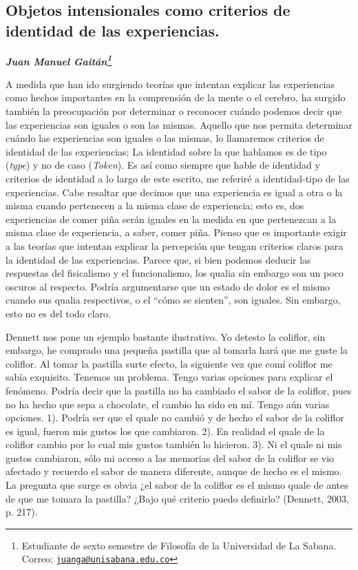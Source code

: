 \documentclass[]{book}
\newcommand{\autor}[1]{            %
  \begin{center}                   %
    \vspace*{-3.5em}               %
    \textbf{\textit{\large #1}}    %
    \vspace*{+4em}                 %
  \end{center}
}
\begin{document}
\begin{refsection}
\chapter{\texorpdfstring{\textbf{Objetos intensionales como criterios de
identidad de las
experiencias.}}{Objetos intensionales como criterios de identidad de las experiencias.}}\label{objetos-intensionales-como-criterios-de-identidad-de-las-experiencias.}

\autor{Juan Manuel Gaitán\footnote{Estudiante de sexto semestre de
  Filosofía de la Universidad de La Sabana. Correo:
  \href{mailto:juanga@unisabana.edu.co}{\nolinkurl{juanga@unisabana.edu.co}}}}

A medida que han ido surgiendo teorías que intentan explicar las
experiencias como hechos importantes en la comprensión de la mente o el
cerebro, ha surgido también la preocupación por determinar o reconocer
cuándo podemos decir que las experiencias son iguales o son las mismas.
Aquello que nos permita determinar cuándo las experiencias son iguales o
las mismas, lo llamaremos criterios de identidad de las experiencias; La
identidad sobre la que hablamos es de tipo (\emph{type}) y no de caso
(\emph{Token}). Es así como siempre que hable de identidad y criterios
de identidad a lo largo de este escrito, me referiré a identidad-tipo de
las experiencias. Cabe resaltar que decimos que una experiencia es igual
a otra o la misma cuando pertenecen a la misma clase de experiencia;
esto es, dos experiencias de comer piña serán iguales en la medida en
que pertenezcan a la misma clase de experiencia, a saber, comer piña.
Pienso que es importante exigir a las teorías que intentan explicar la
percepción que tengan criterios claros para la identidad de las
experiencias. Parece que, si bien podemos deducir las respuestas del
fisicalismo y el funcionalismo, los qualia sin embargo son un poco
oscuros al respecto. Podría argumentarse que un estado de dolor es el
mismo cuando sus qualia respectivos, o el ``cómo se sienten'', son
iguales. Sin embargo, esto no es del todo claro.

Dennett nos pone un ejemplo bastante ilustrativo. Yo detesto la
coliflor, sin embargo, he comprado una pequeña pastilla que al tomarla
hará que me guste la coliflor. Al tomar la pastilla surte efecto, la
siguiente vez que comí coliflor me sabía exquisito. Tenemos un problema.
Tengo varias opciones para explicar el fenómeno. Podría decir que la
pastilla no ha cambiado el sabor de la coliflor, pues no ha hecho que
sepa a chocolate, el cambio ha sido en mí. Tengo aún varias opciones.
1). Podría ser que el quale no cambió y de hecho el sabor de la coliflor
es igual, fueron mis gustos los que cambiaron. 2). En realidad el quale
de la coliflor cambio por lo cual mis gustos también lo hicieron. 3). Ni
el quale ni mis gustos cambiaron, sólo mi acceso a las memorias del
sabor de la coliflor se vio afectado y recuerdo el sabor de manera
diferente, aunque de hecho es el mismo. La pregunta que surge es obvia
¿el sabor de la coliflor es el mismo quale de antes de que me tomara la
pastilla? ¿Bajo qué criterio puedo definirlo? (Dennett, 2003, p. 217).


\end{refsection}
\end{document}
